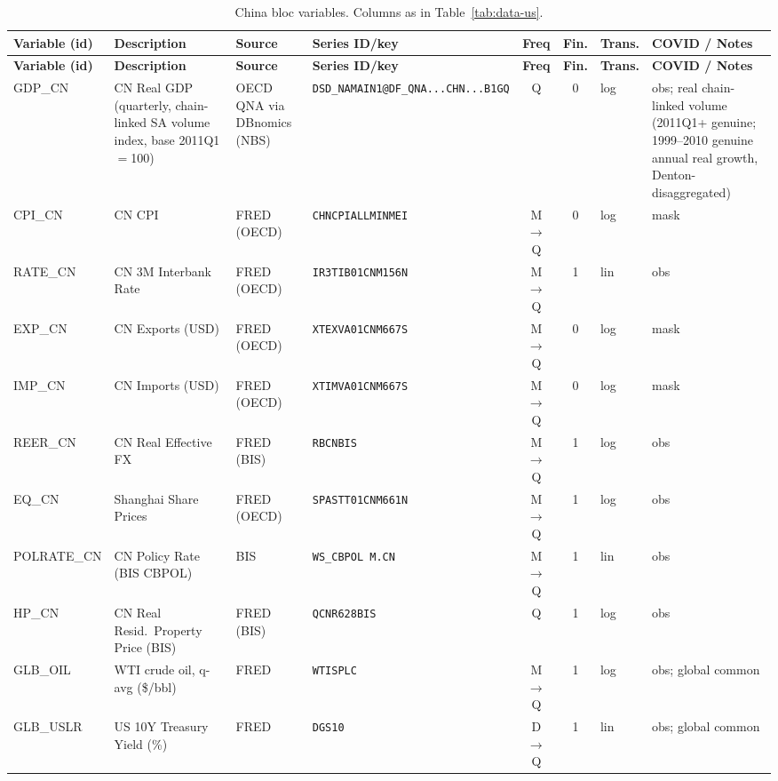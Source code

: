 {\footnotesize\setlength{\tabcolsep}{3.5pt}
\begin{longtable}{@{}>{\raggedright\arraybackslash}p{1.7cm} >{\raggedright\arraybackslash}p{2.7cm} >{\raggedright\arraybackslash}p{1.35cm} >{\raggedright\arraybackslash}p{2.55cm} c c >{\raggedright\arraybackslash}p{0.85cm} >{\raggedright\arraybackslash}p{2.75cm}@{}}
\caption{China bloc variables. Columns as in
Table~\ref{tab:data-us}.}\label{tab:data-cn}\\
\toprule
\textbf{Variable (id)} & \textbf{Description} & \textbf{Source} & \textbf{Series ID/key} & \textbf{Freq} & \textbf{Fin.} & \textbf{Trans.} & \textbf{COVID / Notes} \\
\midrule
\endfirsthead
\toprule
\textbf{Variable (id)} & \textbf{Description} & \textbf{Source} & \textbf{Series ID/key} & \textbf{Freq} & \textbf{Fin.} & \textbf{Trans.} & \textbf{COVID / Notes} \\
\midrule
\endhead
\bottomrule
\endfoot
GDP\_CN     & CN Real GDP (quarterly, chain-linked SA volume index, base 2011Q1$=$100) & OECD QNA via DBnomics (NBS) & \texttt{DSD\_NAMAIN1@DF\_QNA...CHN...B1GQ} & Q & 0 & log & obs; real chain-linked volume (2011Q1+ genuine; 1999--2010 genuine annual real growth, Denton-disaggregated) \\
CPI\_CN     & CN CPI & FRED (OECD) & \texttt{CHNCPIALLMINMEI} & M$\to$Q & 0 & log & mask \\
RATE\_CN    & CN 3M Interbank Rate & FRED (OECD) & \texttt{IR3TIB01CNM156N} & M$\to$Q & 1 & lin & obs \\
EXP\_CN     & CN Exports (USD) & FRED (OECD) & \texttt{XTEXVA01CNM667S} & M$\to$Q & 0 & log & mask \\
IMP\_CN     & CN Imports (USD) & FRED (OECD) & \texttt{XTIMVA01CNM667S} & M$\to$Q & 0 & log & mask \\
REER\_CN    & CN Real Effective FX & FRED (BIS) & \texttt{RBCNBIS} & M$\to$Q & 1 & log & obs \\
EQ\_CN      & Shanghai Share Prices & FRED (OECD) & \texttt{SPASTT01CNM661N} & M$\to$Q & 1 & log & obs \\
POLRATE\_CN & CN Policy Rate (BIS CBPOL) & BIS & \texttt{WS\_CBPOL M.CN} & M$\to$Q & 1 & lin & obs \\
HP\_CN      & CN Real Resid.\ Property Price (BIS) & FRED (BIS) & \texttt{QCNR628BIS} & Q & 1 & log & obs \\
GLB\_OIL    & WTI crude oil, q-avg (\$/bbl) & FRED & \texttt{WTISPLC} & M$\to$Q & 1 & log & obs; global common \\
GLB\_USLR   & US 10Y Treasury Yield (\%) & FRED & \texttt{DGS10} & D$\to$Q & 1 & lin & obs; global common \\

\end{longtable}}
